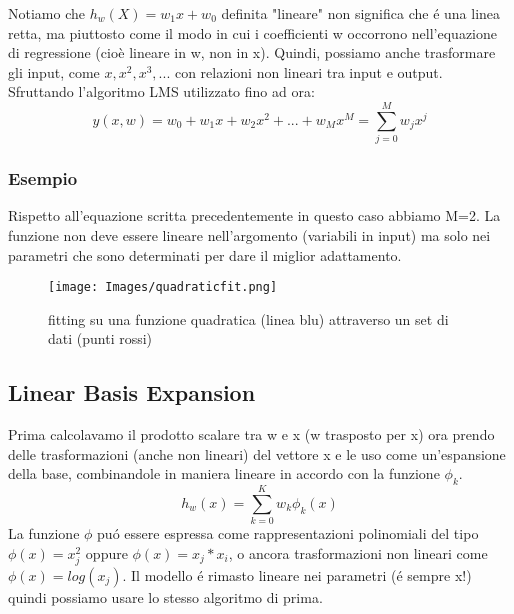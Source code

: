 \documentclass{article}
\begin{document}
Notiamo che $h_w(X)=w_1x+w_0$ definita "lineare" non significa che é una linea retta, ma piuttosto come il modo in cui i coefficienti w occorrono nell'equazione di regressione (cioè lineare in w, non in x). Quindi, possiamo anche trasformare gli input, come $x,x^2,x^3,...$ con relazioni non lineari tra input e output. Sfruttando l'algoritmo LMS utilizzato fino ad ora:
\begin{equation}
    y(x,w) = w_0+w_1x+w_2x^2+...+w_Mx^M=\sum_{j = 0}^M w_jx^j
\end{equation}

\subsubsection{Esempio}
Rispetto all'equazione scritta precedentemente in questo caso abbiamo M=2. La funzione non deve essere lineare nell'argomento (variabili in input) ma solo nei parametri che sono determinati per dare il miglior adattamento. 
\begin{figure}[H]
    \centering
    \texttt{[image: Images/quadraticfit.png]}
    \caption{fitting su una funzione quadratica (linea blu) attraverso un set di dati (punti rossi)}
\end{figure}

\subsection{Linear Basis Expansion}
Prima calcolavamo il prodotto scalare tra w e x (w trasposto per x) ora prendo delle trasformazioni (anche non lineari) del vettore x e le uso come un'espansione della base, combinandole in maniera lineare in accordo con la funzione $\phi_k$. 
\begin{equation}
    h_w(x)=\sum_{k=0}^K w_k \phi_k(x)
\end{equation}
La funzione $\phi$ puó essere espressa come rappresentazioni polinomiali del tipo $\phi(x)=x_j^2$ oppure $\phi(x)=x_j*x_i$, o ancora trasformazioni non lineari come $\phi(x)=log(x_j)$. Il modello é rimasto lineare nei parametri (é sempre x!) quindi possiamo usare lo stesso algoritmo di prima. 
\end{document}

